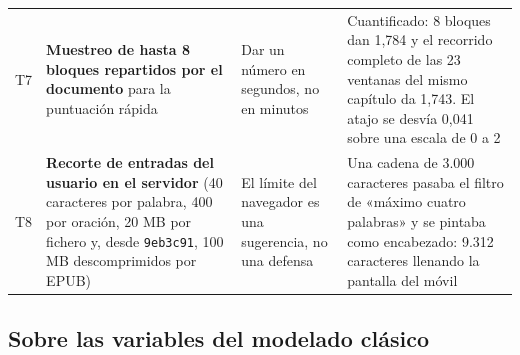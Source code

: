 \documentclass[11pt,a4paper]{article}
\newcommand{\cod}[1]{\texttt{\small #1}}
\begin{document}
\begin{small}
\begin{longtable}{@{}c L{3.2cm} L{3.4cm} L{5.6cm}@{}}
\addlinespace
T7 & \textbf{Muestreo de hasta 8 bloques repartidos por el documento} para la puntuación rápida & Dar un número en segundos, no en minutos & Cuantificado: 8 bloques dan 1,784 y el recorrido completo de las 23 ventanas del mismo capítulo da 1,743. El atajo se desvía 0,041 sobre una escala de 0 a 2 \\
\addlinespace
T8 & \textbf{Recorte de entradas del usuario en el servidor} (40 caracteres por palabra, 400 por oración, 20 MB por fichero y, desde \cod{9eb3c91}, 100 MB descomprimidos por EPUB) & El límite del navegador es una sugerencia, no una defensa & Una cadena de 3.000 caracteres pasaba el filtro de «máximo cuatro palabras» y se pintaba como encabezado: 9.312 caracteres llenando la pantalla del móvil \\
\end{longtable}
\end{small}

\subsection{Sobre las variables del modelado clásico}
\end{document}
